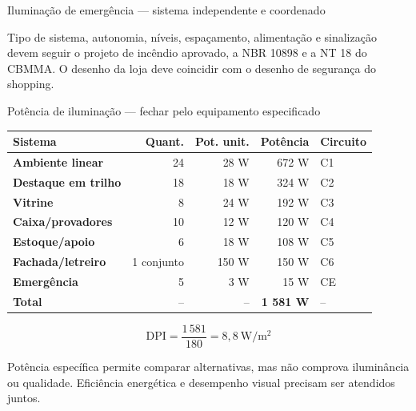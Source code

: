 \begin{frame}{Iluminação de emergência — sistema independente e coordenado}
\centering
{}
\vspace{1mm}
\begin{caixaAt}
Tipo de sistema, autonomia, níveis, espaçamento, alimentação e sinalização devem seguir o projeto de incêndio aprovado, a NBR 10898 e a NT 18 do CBMMA. O desenho da loja deve coincidir com o desenho de segurança do shopping.
\end{caixaAt}
\end{frame}

\begin{frame}{Potência de iluminação — fechar pelo equipamento especificado}
\scriptsize
\begin{tabularx}{\textwidth}{>{\bfseries}p{2.6cm}r r r X}
\toprule
Sistema & Quant. & Pot. unit. & Potência & Circuito \\
\midrule
Ambiente linear & 24 & 28 W & 672 W & C1 \\
Destaque em trilho & 18 & 18 W & 324 W & C2 \\
Vitrine & 8 & 24 W & 192 W & C3 \\
Caixa/provadores & 10 & 12 W & 120 W & C4 \\
Estoque/apoio & 6 & 18 W & 108 W & C5 \\
Fachada/letreiro & 1 conjunto & 150 W & 150 W & C6 \\
Emergência & 5 & 3 W & 15 W & CE \\
\midrule
\textbf{Total} & -- & -- & \textbf{1 581 W} & -- \\
\bottomrule
\end{tabularx}
\[
\mathrm{DPI}=\frac{1\,581}{180}=8{,}8\ \mathrm{W/m^2}
\]
\begin{caixaObs}
Potência específica permite comparar alternativas, mas não comprova iluminância ou qualidade. Eficiência energética e desempenho visual precisam ser atendidos juntos.
\end{caixaObs}
\end{frame}

